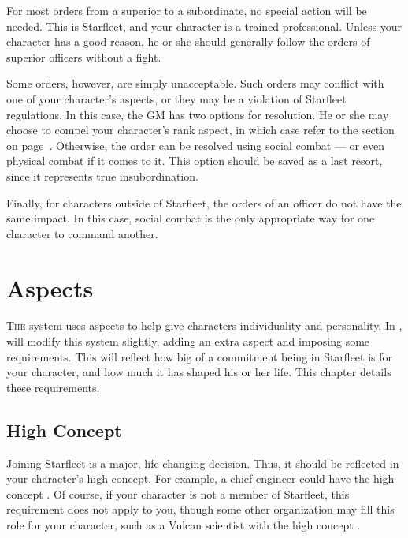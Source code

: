 \documentclass[12pt,titlepage,openany]{book}
\begin{document}
For most orders from a superior to a subordinate, no special action will be
needed. This is Starfleet, and your character is a trained professional.
Unless your character has a good reason, he or she should generally follow the
orders of superior officers without a fight.

Some orders, however, are simply unacceptable. Such orders may conflict with
one of your character's aspects, or they may be a violation of Starfleet
regulations. In this case, the GM has two options for resolution. He or she may
choose to compel your character's rank aspect, in which case refer to the
section  on page~\pageref{sec:aspects-orders}.
Otherwise, the order can be resolved using social combat --- or even physical
combat if it comes to it. This option should be saved as a last resort, since
it represents true insubordination.

Finally, for characters outside of Starfleet, the orders of an officer do not
have the same impact. In this case, social combat is the only appropriate way
for one character to command another.



\chapter{Aspects}\label{chap:aspects}

\lettrine[lines=1]{T}{he} \FateCore{} system uses aspects to help give
characters individuality and personality. In \StarTrekFate{}, will modify this
system slightly, adding an extra aspect and imposing some requirements. This
will reflect how big of a commitment being in Starfleet is for your character,
and how much it has shaped his or her life. This chapter details these
requirements.

\section{High Concept}\label{sec:high-concept}

Joining Starfleet is a major, life-changing decision. Thus, it should be
reflected in your character's high concept. For example, a chief engineer could
have the high concept . Of course, if your character
is not a member of Starfleet, this requirement does not apply to you, though
some other organization may fill this role for your character, such as a Vulcan
scientist with the high concept .
\end{document}
